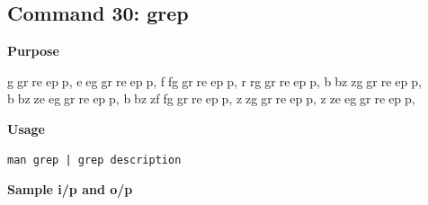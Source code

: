 \subsection{Command 30: grep} 
\textbf{Purpose}
\begin{flushleft}
     ggrreepp, eeggrreepp, ffggrreepp, rrggrreepp, bbzzggrreepp, bbzzeeggrreepp, bbzzffggrreepp, zzggrreepp, zzeeggrreepp,
\end{flushleft}
\textbf{Usage}
\begin{verbatim}
man grep | grep description
\end{verbatim}
\textbf{Sample i/p and o/p}
\begin{figure}[H] 
\end{figure}
